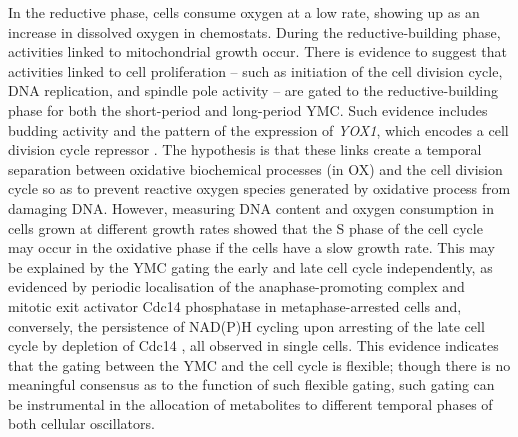 In the reductive phase, cells consume oxygen at a low rate, showing up as an increase in dissolved oxygen in chemostats.
During the reductive-building phase, activities linked to mitochondrial growth occur.
There is evidence to suggest that activities linked to cell proliferation -- such as initiation of the cell division cycle, DNA replication, and spindle pole activity -- are gated to the reductive-building phase for both the short-period and long-period YMC.
Such evidence includes budding activity and the pattern of the expression of \emph{YOX1}, which encodes a cell division cycle repressor \citep{tuLogicYeastMetabolic2005}.
The hypothesis is that these links create a temporal separation between oxidative biochemical processes (in OX) and the cell division cycle so as to prevent reactive oxygen species generated by oxidative process from damaging DNA.
However, measuring DNA content and oxygen consumption in cells grown at different growth rates \citep{slavovCouplingGrowthRate2011} showed that the S phase of the cell cycle may occur in the oxidative phase if the cells have a slow growth rate.
This may be explained by the YMC gating the early and late cell cycle independently, as evidenced by periodic localisation of the anaphase-promoting complex and mitotic exit activator Cdc14 phosphatase in metaphase-arrested cells \parencite{luPeriodicCyclinCdkActivity2010} and, conversely, the persistence of NAD(P)H cycling upon arresting of the late cell cycle by depletion of Cdc14 \parencite{papagiannakisAutonomousMetabolicOscillations2017}, all observed in single cells.
This evidence indicates that the gating between the YMC and the cell cycle is flexible;
though there is no meaningful consensus as to the function of such flexible gating,
such gating can be instrumental in the allocation of metabolites to different temporal phases of both cellular oscillators.

